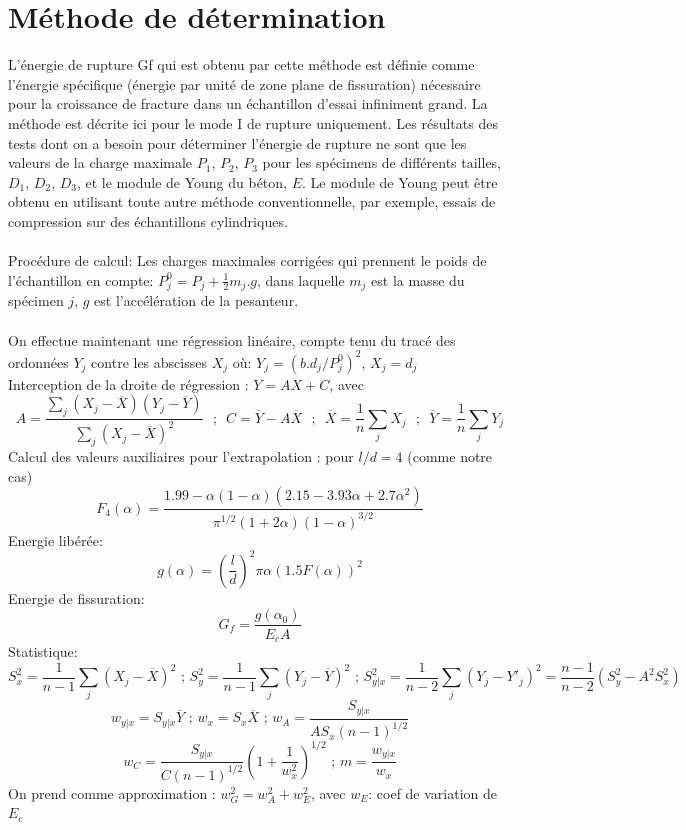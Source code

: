 \documentclass[12pt]{report}
\begin{document}
\section{Méthode de détermination}
L'énergie de rupture Gf qui est obtenu par cette méthode est définie comme l'énergie spécifique
(énergie par unité de zone plane de fissuration) nécessaire pour la croissance de fracture dans un
échantillon d'essai infiniment grand. La méthode est décrite ici pour le mode I de rupture
uniquement. Les résultats des tests dont on a besoin pour déterminer l'énergie de rupture ne sont
que les valeurs de la charge maximale $P_1$, $P_2$, $P_3$ pour les spécimens de différents tailles, $D_1$,
$D_2$, $D_3$, et le module de Young du béton, $E$. Le module de Young peut être obtenu en utilisant
toute autre méthode conventionnelle, par exemple, essais de compression sur des échantillons cylindriques.
\\\\
Procédure de calcul: Les charges maximales corrigées qui prennent le poids de
l'échantillon en compte: $P_{j}^{0} = P_j + \frac{1}{2}m_j.g$, dans laquelle $m_j$ est la masse du spécimen $j$, $g$ est l'accélération de la pesanteur.
\\\\
On effectue maintenant une régression linéaire, compte tenu du tracé des ordonnées $Y_j$ contre les abscisses $X_j$ où: $Y_j = (b.d_j/P_{j}^{0})^2$, $X_j = d_j$
\\
Interception de la droite de régression : $Y = AX + C$, avec
\[A=\frac{\sum_{j} (X_j-\overline{X})(Y_j-\overline{Y})}{\sum_{j} (X_j-\overline{X})^2} \text{{  };{  }} C=\overline{Y}-A\overline{X} \text{{  };{  }} \overline{X}=\frac{1}{n}\sum_{j}X_j \text{{  };{  }} \overline{Y}=\frac{1}{n}\sum_{j}Y_j\]
Calcul des valeurs auxiliaires pour l'extrapolation : pour $l/d = 4$ (comme notre cas)
\[F_4(\alpha)=\frac{1.99-\alpha(1-\alpha)(2.15-3.93\alpha+2.7\alpha^2)}{\pi^{1/2}(1+2\alpha)(1-\alpha)^{3/2}}\]
Energie libérée:
\[g(\alpha)=(\frac{l}{d})^2\pi\alpha(1.5F(\alpha))^2\]
Energie de fissuration:
\[G_f=\frac{g(\alpha_0)}{E_cA}\]
Statistique:
\[S_{x}^{2}=\frac{1}{n-1}\sum_{j} (X_j-\overline{X})^2\text{ ; }S_{y}^{2}=\frac{1}{n-1}\sum_{j} (Y_j-\overline{Y})^2\text{ ; }S_{y|x}^{2}=\frac{1}{n-2}\sum_{j} (Y_{j}-Y'_j)^{2}=\frac{n-1}{n-2}(S_{y}^{2}-A^2S_{x}^{2})\]
\[w_{y|x}=S_{y|x}\overline{Y}\text{ ; }w_x=S_x\overline{X}\text{ ; }w_A=\frac{S_{y|x}}{AS_x(n-1)^{1/2}}\]
\[w_C=\frac{S_{y|x}}{C(n-1)^{1/2}}(1+\frac{1}{w_{x}^{2}})^{1/2}\text{ ; }m=\frac{w_{y|x}}{w_x}\]
On prend comme approximation : $w_{G}^{2}=w_{A}^{2}+w_{E}^{2}$, avec $w_E$: coef de variation de $E_c$
\end{document}
